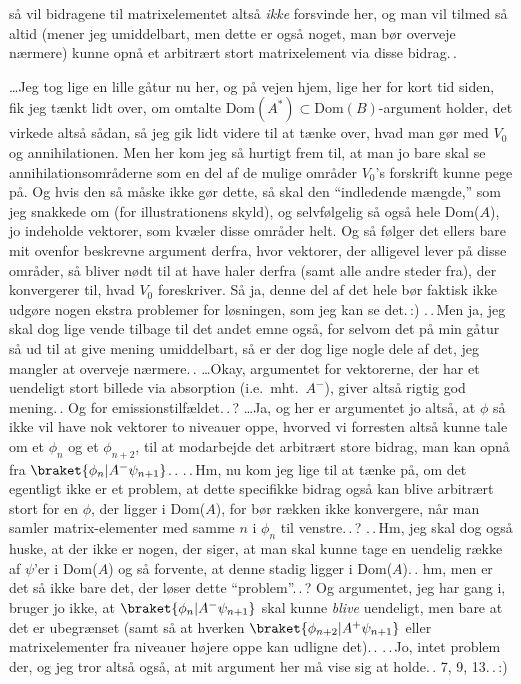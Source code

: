 \documentclass{report}
\begin{document}
så vil bidragene til matrixelementet altså \emph{ikke} forsvinde her, og man vil tilmed så altid (mener jeg umiddelbart, men dette er også noget, man bør overveje nærmere) kunne opnå et arbitrært stort matrixelement via disse bidrag.\,. %

\ldots Jeg tog lige en lille gåtur nu her, og på vejen hjem, lige her for kort tid siden, fik jeg tænkt lidt over, om omtalte Dom$(A^*)\subset\mathrm{Dom}(B)$-argument holder, det virkede altså sådan, så jeg gik lidt videre til at tænke over, hvad man gør med $V_0$ og annihilationen. Men her kom jeg så hurtigt frem til, at man jo bare skal se annihilationsområderne som en del af de mulige områder $V_0$'s forskrift kunne pege på. Og hvis den så måske ikke gør dette, så skal den ``indledende mængde,'' som jeg snakkede om (for illustrationens skyld), og selvfølgelig så også hele Dom($A$), jo indeholde vektorer, som kvæler disse områder helt. Og så følger det ellers bare mit ovenfor beskrevne argument derfra, hvor vektorer, der alligevel lever på disse områder, så bliver nødt til at have haler derfra (samt alle andre steder fra), der konvergerer til, hvad $V_0$ foreskriver. Så ja, denne del af det hele bør faktisk ikke udgøre nogen ekstra problemer for løsningen, som jeg kan se det.\,:) .\,.\,Men ja, jeg skal dog lige vende tilbage til det andet emne også, for selvom det på min gåtur så ud til at give mening umiddelbart, så er der dog lige nogle dele af det, jeg mangler at overveje nærmere.\,. \ldots Okay, argumentet for vektorerne, der har et uendeligt stort billede via absorption (i.e.\ mht.\ $A^-$), giver altså rigtig god mening.\,. Og for emissionstilfældet.\,.\,? \ldots Ja, og her er argumentet jo altså, at $\phi$ så ikke vil have nok vektorer to niveauer oppe, hvorved vi forresten altså kunne tale om et $\phi_n$ og et $\phi_{n+2}$, til at modarbejde det arbitrært store bidrag, man kan opnå fra $\braket{\phi_n | A^- \psi_{n+1}}$.\,. .\,.\,Hm, nu kom jeg lige til at tænke på, om det egentligt ikke er et problem, at dette specifikke bidrag også kan blive arbitrært stort for en $\phi$, der ligger i Dom($A$), for bør rækken ikke konvergere, når man samler matrix-elementer med samme $n$ i $\phi_n$ til venstre.\,.\,? .\,.\,Hm, jeg skal dog også huske, at der ikke er nogen, der siger, at man skal kunne tage en uendelig række af $\psi$'er i Dom($A$) og så forvente, at denne stadig ligger i Dom($A$).\,. hm, men er det så ikke bare det, der løser dette ``problem''.\,.\,? Og argumentet, jeg har gang i, bruger jo ikke, at $\braket{\phi_n | A^- \psi_{n+1}}$ skal kunne \emph{blive} uendeligt, men bare at det er ubegrænset (samt så at hverken $\braket{\phi_{n+2} | A^+ \psi_{n+1}}$ eller matrixelementer fra niveauer højere oppe kan udligne det).\,. .\,.\,Jo, intet problem der, og jeg tror altså også, at mit argument her må vise sig at holde.\,. 7, 9, 13.\,.\,:) 
\end{document}

